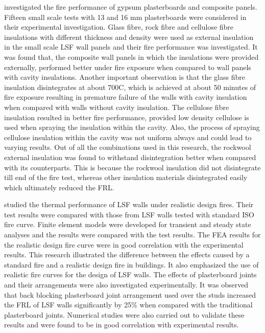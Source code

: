 \citet{Kolarkar2014} investigated the fire performance of gypsum plasterboards and composite panels. Fifteen small scale tests with 13 and 16 mm plasterboards were considered in their experimental investigation. Glass fibre, rock fibre and cellulose fibre insulations with different thickness and density were used as external insulation in the small scale LSF wall panels and their fire performance was investigated. It was found that, the composite wall panels in which the insulations were provided externally, performed better under fire exposure when compared to wall panels with cavity insulations. Another important observation is that the glass fibre insulation disintegrates at about 700\degree C, which is achieved at about 50 minutes of fire exposure resulting in premature failure of the walls with cavity insulation when compared with walls without cavity insulation. The cellulose fibre insulation resulted in better fire performance, provided low density cellulose is used when spraying the insulation within the cavity. Also, the process of spraying cellulose insulation within the cavity was not uniform always and could lead to varying results. Out of all the combinations used in this research, the rockwool external insulation was found to withstand disintegration better when compared with its counterparts. This is because the rockwool insulation did not disintegrate till end of the fire test, whereas other insulation materials disintegrated easily which ultimately reduced the FRL. 

\citet{Ariyanayagam2014e} studied the thermal performance of LSF walls under realistic design fires. Their test results were compared with those from LSF walls tested with standard ISO fire curve. Finite element models were developed for transient and steady state analyses and the results were compared with the test results. The FEA results for the realistic design fire curve were in good correlation with the experimental results. This research illustrated the difference between the effects caused by a standard fire and a realistic design fire in buildings. It also emphasized the use of realistic fire curves for the design of LSF walls. The effects of plasterboard joints and their arrangements were also investigated experimentally. It was observed that back blocking plasterboard joint arrangement used over the studs increased the FRL of LSF walls significantly by 25\% when compared with the traditional plasterboard joints. Numerical studies were also carried out to validate these results and were found to be in good correlation with experimental results. 


